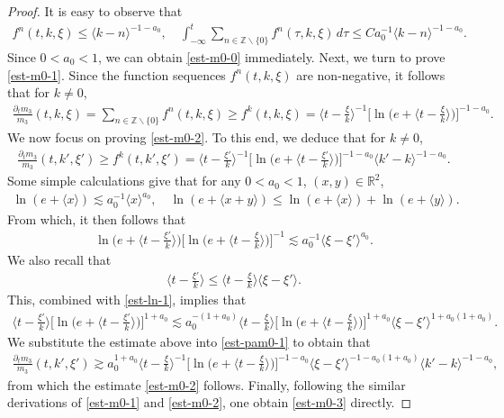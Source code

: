 \documentclass[11pt,reqno]{article}
\numberwithin{equation}{section}
\newcommand\R{{\mathbb R}}
\newcommand\Z{{\mathbb Z}}
\let\pa=\partial
\let\f=\frac
\begin{document}
\begin{proof}
    It is easy to observe that
	\begin{align*}
		f^n(t,k,\xi)\leq \langle k-n\rangle^{-1-a_0},\quad \int_{-\infty}^{t}\sum_{n\in\Z\backslash\{0\}}f^{n}(\tau,k,\xi)\,d\tau\leq Ca_0^{-1}\langle k-n\rangle^{-1-a_0}.
	\end{align*}
    Since $0<a_0<1$, we can obtain \eqref{est-m0-0} immediately.
    Next, we turn to prove \eqref{est-m0-1}.
	Since the function sequences $f^n(t,k,\xi)$ are non-negative, it follows that for $k\not=0$,
	\begin{align*}
		\f{\pa_t m_3}{m_3}(t,k,\xi) =\sum_{n\in\Z\backslash\{0\}} f^n(t,k,\xi) \geq f^k(t,k,\xi)
		=\big\langle t-\f{\xi}{k}\big\rangle^{-1} \big[\ln\big(e+\big\langle t-\f{\xi}{k}\big\rangle\big)\big]^{-1-a_0}.
	\end{align*}
    We now focus on proving \eqref{est-m0-2}. 
    To this end, we deduce that for $k\not=0$,
	\begin{align}\label{est-pam0-1}
		\f{\pa_t m_3}{m_3}(t,k',\xi')
		\geq f^k(t,k',\xi')
		=\big\langle t-\f{\xi'}{k}\big\rangle^{-1} \big[\ln\big(e+\big\langle t-\f{\xi'}{k}\big\rangle\big)\big]^{-1-a_0}\langle k'-k\rangle^{-1-a_0}.
	\end{align}
    Some simple calculations give that for any $0<a_0<1$, $(x,y)\in\R^2$,
	\begin{align*}
		\ln(e+\langle x\rangle)\lesssim a_0^{-1} \langle x\rangle^{a_0},
		\quad
		\ln(e+\langle x+y\rangle)\leq \ln(e+\langle x\rangle)+\ln(e+\langle y\rangle).
	\end{align*}
    From which, it then follows that
	\begin{align}\label{est-ln-1}
		\ln\big(e+\big\langle t-\f{\xi'}{k}\big\rangle\big)\big[\ln\big(e+\big\langle t-\f{\xi}{k}\big\rangle\big)\big]^{-1}
		\lesssim a_0^{-1}\langle \xi-\xi'\rangle^{a_0}.
	\end{align}
    We also recall that
	\begin{align*}
		\big\langle t-\f{\xi'}{k}\big\rangle \leq \big\langle t-\f{\xi}{k}\big\rangle \langle \xi-\xi'\rangle.
	\end{align*}
    This, combined with \eqref{est-ln-1}, implies that
	\begin{align*}
		\big\langle t-\f{\xi'}{k}\big\rangle\big[\ln\big(e+\big\langle t-\f{\xi'}{k}\big\rangle\big)\big]^{1+a_0}
		\lesssim
		a_0^{-(1+a_0)}\big\langle t-\f{\xi}{k}\big\rangle 
		\big[\ln\big(e+\big\langle t-\f{\xi}{k}\big\rangle\big)\big]^{1+a_0}  \langle \xi-\xi'\rangle^{1+a_0(1+a_0)}.
	\end{align*}
	We substitute the estimate above into \eqref{est-pam0-1} to obtain that
	\begin{align*}
		\f{\pa_t m_3}{m_3}(t,k',\xi')
		\gtrsim  a_0^{1+a_0}
		\big\langle t-\f{\xi}{k}\big\rangle^{-1} 
		\big[\ln\big(e+\big\langle t-\f{\xi}{k}\big\rangle\big)\big]^{-1-a_0}  \langle \xi-\xi'\rangle^{-1-a_0(1+a_0)}\langle k'-k\rangle^{-1-a_0},
	\end{align*}
	from which the estimate \eqref{est-m0-2} follows.
    Finally, following the similar derivations of \eqref{est-m0-1} and \eqref{est-m0-2}, one obtain \eqref{est-m0-3} directly.
\end{proof}
\end{document}
